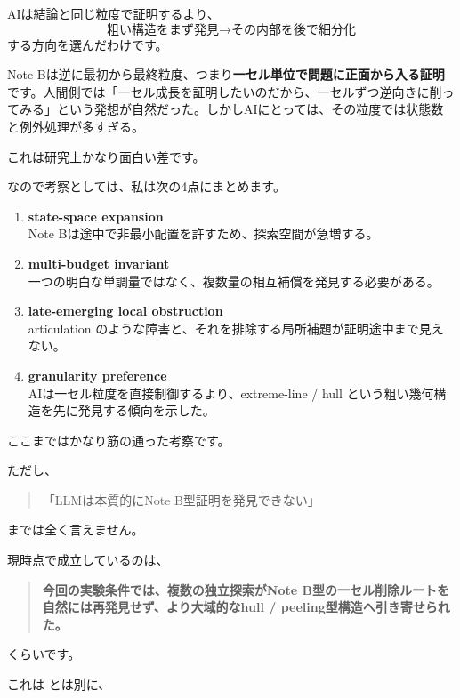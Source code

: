 \documentclass[11pt,a4paper]{article}
\begin{document}
AIは結論と同じ粒度で証明するより、
\[
\text{粗い構造をまず発見}
\to
\text{その内部を後で細分化}
\]
する方向を選んだわけです。

Note Bは逆に最初から最終粒度、つまり\textbf{一セル単位で問題に正面から入る証明}です。人間側では「一セル成長を証明したいのだから、一セルずつ逆向きに削ってみる」という発想が自然だった。しかしAIにとっては、その粒度では状態数と例外処理が多すぎる。

これは研究上かなり面白い差です。

なので考察としては、私は次の4点にまとめます。

\begin{enumerate}[leftmargin=2.4em]
\item \textbf{state-space expansion}\\
Note Bは途中で非最小配置を許すため、探索空間が急増する。

\item \textbf{multi-budget invariant}\\
一つの明白な単調量ではなく、複数量の相互補償を発見する必要がある。

\item \textbf{late-emerging local obstruction}\\
articulation のような障害と、それを排除する局所補題が証明途中まで見えない。

\item \textbf{granularity preference}\\
AIは一セル粒度を直接制御するより、extreme-line / hull という粗い幾何構造を先に発見する傾向を示した。
\end{enumerate}

ここまではかなり筋の通った考察です。

ただし、

\begin{quote}
「LLMは本質的にNote B型証明を発見できない」
\end{quote}

までは全く言えません。

現時点で成立しているのは、

\begin{quote}
\textbf{今回の実験条件では、複数の独立探索がNote B型の一セル削除ルートを自然には再発見せず、より大域的なhull / peeling型構造へ引き寄せられた。}
\end{quote}

くらいです。

これは  とは別に、
\end{document}
